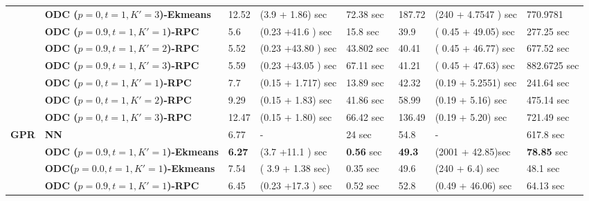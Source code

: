 {\begin{table}[htbp!]
{\begin{tabular}{|l|l|lll|lll|}
       & \textbf{ODC ($p= 0, t=1, K'=3$)-Ekmeans} &   12.52    &    (3.9 + 1.86) sec   &    72.38 sec  &    187.72   & (240 + 4.7547 ) sec       &  770.9781 \\%
      &  \textbf{ODC ($p= 0.9, t=1, K'=1$)-RPC} & 5.6      &      (0.23 +41.6 ) sec  &   15.8 sec  &   39.9  &    ( 0.45 + 49.05) sec     & 277.25 sec\\%
         &  \textbf{ODC ($p= 0.9, t=1, K'=2$)-RPC} & 5.52      &      (0.23 +43.80 ) sec  &   43.802 sec  &   40.41  &    ( 0.45 + 46.77) sec     & 677.52 sec\\%
        &  \textbf{ODC ($p= 0.9, t=1, K'=3$)-RPC} & 5.59  &      (0.23 +43.05 ) sec  &   67.11 sec  &    41.21&    ( 0.45 + 47.63) sec     &  882.6725 sec\\%
  &  \textbf{ODC ($p= 0, t=1, K'=1$)-RPC} &   7.7    &   (0.15 + 1.717) sec   &   13.89 sec  &  42.32    &  (0.19 + 5.2551)      sec &  241.64 sec\\%
    &  \textbf{ODC ($p= 0, t=1, K'=2$)-RPC} &   9.29 &   (0.15 + 1.83) sec   &   41.86 sec  &  58.99    &  (0.19 + 5.16)      sec &  475.14 sec\\%
      &  \textbf{ODC ($p= 0, t=1, K'=3$)-RPC} &   12.47    &   (0.15 + 1.80) sec   &   66.42 sec  &  136.49    &  (0.19 + 5.20)      sec &  721.49 sec\\%
      \hline
  \textbf{GPR}  & \textbf{NN} & 6.77      &   -    &  24 sec     &   54.8    &      - &    617.8  sec \\%
   & \textbf{ODC ($p= 0.9, t=1 , K'=1$)-Ekmeans} &  \textbf{6.27}      &  (3.7 +11.1 ) sec  &       \textbf{0.56}  sec & \textbf{49.3}  &   (2001 + 42.85)sec & \textbf{78.85} sec \\%
   & \textbf{ODC($p= 0.0, t=1 , K'=1$)-Ekmeans} & 7.54      &   ( 3.9 + 1.38 sec) &    0.35 sec   & 49.6  &  (240 + 6.4) sec  &  48.1 sec\\%
  & \textbf{ODC ($p= 0.9, t=1 , K'=1$)-RPC} &  6.45      &  (0.23 +17.3 ) sec  &       0.52  sec & 52.8  & (0.49 + 46.06) sec     &  64.13 sec\\%

\end{tabular}}
\end{table}}
